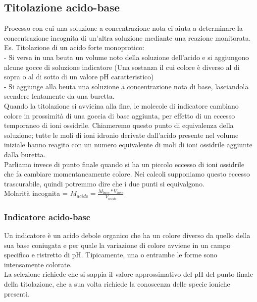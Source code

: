 \subsection{Titolazione acido-base}
Processo con cui una soluzione a concentrazione nota ci aiuta a determinare la concentrazione incognita di un'altra soluzione mediante una reazione monitorata.\\
Es. Titolazione di un acido forte monoprotico:\\
\tab- Si versa in una beuta un volume noto della soluzione dell'acido e si aggiungono alcune gocce di soluzione indicatore (Una sostanza il cui colore è diverso al di sopra o al di sotto di un valore pH caratteristico)\\
\tab- Si aggiunge alla beuta una soluzione a concentrazione nota di base, lasciandola scendere lentamente da una buretta.\\
Quando la titolazione si avvicina alla fine, le molecole di indicatore cambiano colore in prossimità di una goccia di base aggiunta, per effetto di un eccesso temporaneo di ioni ossidrile. Chiameremo questo punto di equivalenza della soluzione; tutte le moli di ioni idronio derivate dall'acido presente nel volume iniziale hanno reagito con un numero equivalente di moli di ioni ossidrile aggiunte dalla buretta.\\
Parliamo invece di punto finale quando si ha un piccolo eccesso di ioni ossidrile che fa cambiare momentaneamente colore. Nei calcoli supponiamo questo eccesso trascurabile, quindi potremmo dire che i due punti si equivalgono.\\
Molarità incognita = $M_{acido} = \frac{M_{base}*V_{base}}{V_{acido}}$
\subsubsection{Indicatore acido-base}
Un indicatore è un acido debole organico che ha un colore diverso da quello della sua base coniugata e per quale la variazione di colore avviene in un campo specifico e ristretto di pH. Tipicamente, una o entrambe le forme sono intensamente colorate.\\
La selezione richiede che si sappia il valore approssimativo del pH del punto finale della titolazione, che a sua volta richiede la conoscenza delle specie ioniche presenti.\\
